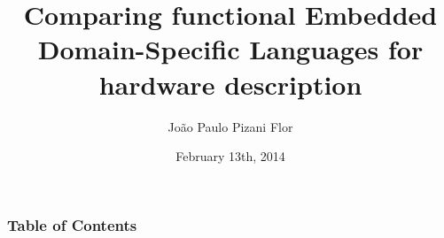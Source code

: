 \documentclass{beamer}
\title[Comparing functional EDSLs for hardware description]{Comparing functional Embedded Domain-Specific Languages for hardware description}
\date{February 13th, 2014}
\author[Pizani Flor]
{
    João Paulo Pizani Flor
}
\institute[Utrecht University]
{
    Department of Information and Computing Sciences,
    Utrecht University
}
\begin{document}
    \begin{frame}
        \titlepage
    \end{frame}

    \begin{frame}
        \frametitle{Table of Contents}
        \tableofcontents
    \end{frame}


    
    
    
    
    
\end{document}
